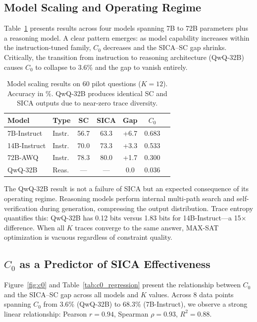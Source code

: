 \documentclass[11pt,a4paper]{article}
\begin{document}
\subsection{Model Scaling and Operating Regime}
\label{sec:scaling}

Table~\ref{tab:scaling} presents results across four models spanning 7B to 72B parameters plus a reasoning model.
A clear pattern emerges: as model capability increases within the instruction-tuned family, $C_0$ decreases and the SICA--SC gap shrinks.
Critically, the transition from instruction to reasoning architecture (QwQ-32B) causes $C_0$ to collapse to 3.6\% and the gap to vanish entirely.

\begin{table}[t]
\centering
\small
\begin{tabular}{llccccc}
\toprule
\textbf{Model} & \textbf{Type} & \textbf{SC} & \textbf{SICA} & \textbf{Gap} & $C_0$ \\
\midrule
7B-Instruct   & Instr. & 56.7 & 63.3 & +6.7 & 0.683 \\
14B-Instruct  & Instr. & 70.0 & 73.3 & +3.3 & 0.533 \\
72B-AWQ       & Instr. & 78.3 & 80.0 & +1.7 & 0.300 \\
QwQ-32B       & Reas.  & ---  & ---  & 0.0  & 0.036 \\
\bottomrule
\end{tabular}
\caption{Model scaling results on 60 pilot questions ($K\!=\!12$). Accuracy in \%. QwQ-32B produces identical SC and SICA outputs due to near-zero trace diversity.}
\label{tab:scaling}
\end{table}

The QwQ-32B result is not a failure of SICA but an expected consequence of its operating regime.
Reasoning models perform internal multi-path search and self-verification during generation, compressing the output distribution.
Trace entropy quantifies this: QwQ-32B has 0.12 bits versus 1.83 bits for 14B-Instruct---a 15$\times$ difference.
When all $K$ traces converge to the same answer, MAX-SAT optimization is vacuous regardless of constraint quality.

\subsection{$C_0$ as a Predictor of SICA Effectiveness}
\label{sec:c0}

Figure~\ref{fig:c0} and Table~\ref{tab:c0_regression} present the relationship between $C_0$ and the SICA--SC gap across all models and $K$ values.
Across 8 data points spanning $C_0$ from 3.6\% (QwQ-32B) to 68.3\% (7B-Instruct), we observe a strong linear relationship: Pearson $r = 0.94$, Spearman $\rho = 0.93$, $R^2 = 0.88$.
\end{document}
